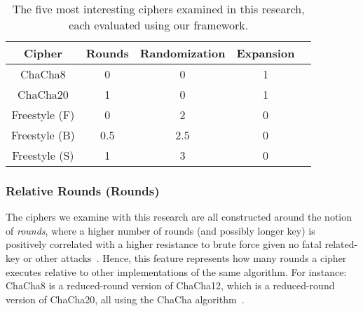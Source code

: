 \begin{table}[ht]
   \begin{tabular}{@{}ccccc@{}}
   \toprule
   \textbf{Cipher} & \textbf{Rounds} & \textbf{Randomization} &
   \textbf{Expansion} \\
   \midrule
   ChaCha8         & 0           & 0           & 1           \\
   ChaCha20        & 1           & 0           & 1           \\
   Freestyle (F)   & 0           & 2           & 0           \\
   Freestyle (B)   & 0.5         & 2.5         & 0           \\
   Freestyle (S)   & 1           & 3           & 0           \\
\end{tabular}
\caption{The five most interesting ciphers examined in this research, each
  evaluated using our framework. 
  }
   \label{tbl:security-quant}
 \end{table}

\subsubsection{Relative Rounds (Rounds)}

The ciphers we examine with this research are all constructed around the notion
of \emph{rounds}, where a higher number of rounds (and possibly longer key) is
positively correlated with a higher resistance to brute force given no fatal
related-key or other attacks~\cite{ChaCha-Cryptanalysis}. Hence, this feature
represents how many rounds a cipher executes relative to other implementations
of the same algorithm. For instance: ChaCha8 is a reduced-round version of
ChaCha12, which is a reduced-round version of ChaCha20, all using the ChaCha
algorithm~\cite{ChaCha20,ChaCha-Cryptanalysis}.

